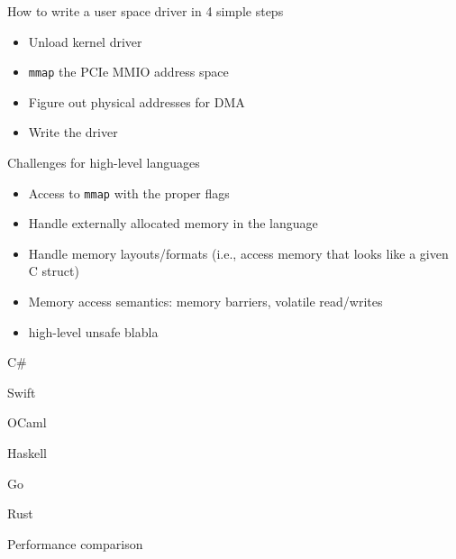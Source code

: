 \documentclass[NET,english,aspectratio=169,notitleframe]{tumbeamer}
\begin{document}
\begin{frame}{How to write a user space driver in 4 simple steps}
\begin{itemize}
\item[1.] Unload kernel driver
\item[2.] \texttt{mmap} the PCIe MMIO address space
\item[3.] Figure out physical addresses for DMA
\item[4.] Write the driver
\end{itemize}
\end{frame}


\begin{frame}{Challenges for high-level languages}
\begin{itemize}
\item Access to \texttt{mmap} with the proper flags
\item Handle externally allocated memory in the language
\item Handle memory layouts/formats (i.e., access memory that looks like a given C struct)
\item Memory access semantics: memory barriers, volatile read/writes
\vspace{1em}
\pause
\item high-level unsafe blabla
\end{itemize}
\end{frame}



\begin{frame}{C\#}
\end{frame}

\begin{frame}{Swift}
\end{frame}

\begin{frame}{OCaml}
\end{frame}

\begin{frame}{Haskell}
\end{frame}

\begin{frame}{Go}
\end{frame}

\begin{frame}{Rust}
\end{frame}

\begin{frame}{Performance comparison}
\end{frame}
\end{document}
